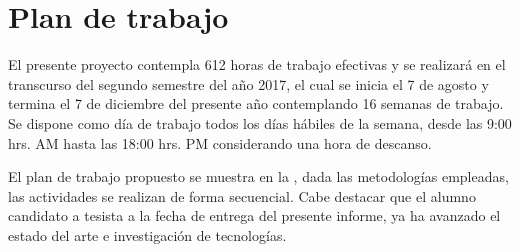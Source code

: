\chapter{Plan de trabajo}
\label{ch:plan_trabajo}

El presente proyecto contempla 612 horas de trabajo efectivas y se realizará en el transcurso del segundo semestre del año 2017, el cual se inicia el 7 de agosto y termina el 7 de diciembre del presente año contemplando 16 semanas de trabajo. Se dispone como día de trabajo todos los días hábiles de la semana, desde las 9:00 hrs. AM hasta las 18:00 hrs. PM considerando una hora de descanso.

El plan de trabajo propuesto se muestra en la , dada las metodologías empleadas, las actividades se realizan de forma secuencial. Cabe destacar que el alumno candidato a tesista a la fecha de entrega del presente informe, ya ha avanzado el estado del arte e investigación de tecnologías.


